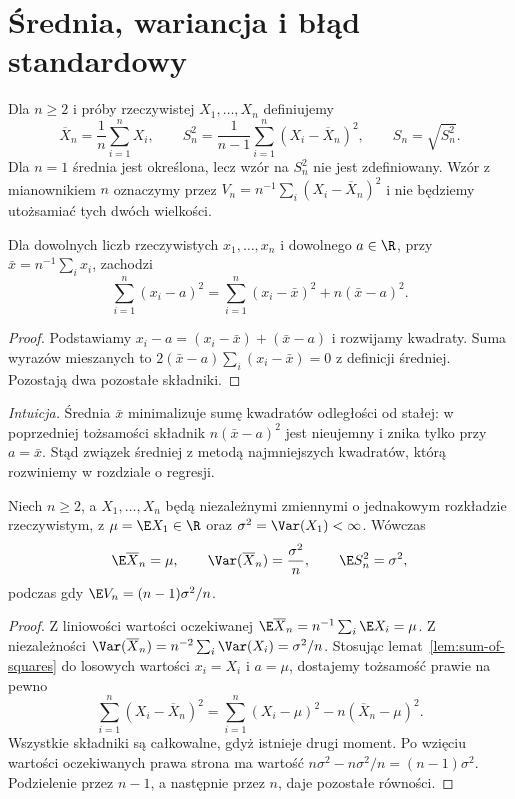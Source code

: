 \section{Średnia, wariancja i błąd standardowy}
\begin{definicja}\label{def:meanvar}
Dla $n\ge2$ i próby rzeczywistej $X_1,\ldots,X_n$ definiujemy
\[
\overline X_n=\frac1n\sum_{i=1}^nX_i,\qquad
S_n^2=\frac1{n-1}\sum_{i=1}^n(X_i-\overline X_n)^2,\qquad S_n=\sqrt{S_n^2}.
\]
Dla $n=1$ średnia jest określona, lecz wzór na $S_n^2$ nie jest zdefiniowany. Wzór z mianownikiem $n$ oznaczymy przez $V_n=n^{-1}\sum_i(X_i-\overline X_n)^2$ i nie będziemy utożsamiać tych dwóch wielkości.
\end{definicja}

\begin{lemat}\label{lem:sum-of-squares}
Dla dowolnych liczb rzeczywistych $x_1,\ldots,x_n$ i dowolnego $a\in\R$, przy $\bar x=n^{-1}\sum_i x_i$, zachodzi
\[
\sum_{i=1}^n(x_i-a)^2
=\sum_{i=1}^n(x_i-\bar x)^2+n(\bar x-a)^2.
\]
\end{lemat}
\begin{proof}
Podstawiamy $x_i-a=(x_i-\bar x)+(\bar x-a)$ i rozwijamy kwadraty. Suma wyrazów mieszanych to $2(\bar x-a)\sum_i(x_i-\bar x)=0$ z definicji średniej. Pozostają dwa pozostałe składniki.
\end{proof}

\emph{Intuicja.} Średnia $\bar x$ minimalizuje sumę kwadratów odległości od stałej: w poprzedniej tożsamości składnik $n(\bar x-a)^2$ jest nieujemny i znika tylko przy $a=\bar x$. Stąd związek średniej z metodą najmniejszych kwadratów, którą rozwiniemy w rozdziale o regresji.

\begin{twierdzenie}\label{thm:unbiased-variance}
Niech $n\ge2$, a $X_1,\ldots,X_n$ będą niezależnymi zmiennymi o jednakowym rozkładzie rzeczywistym, z $\mu=\E X_1\in\R$ oraz $\sigma^2=\Var(X_1)<\infty$. Wówczas
\[
\E\overline X_n=\mu,\qquad
\Var(\overline X_n)=\frac{\sigma^2}{n},\qquad
\E S_n^2=\sigma^2,
\]
podczas gdy $\E V_n=(n-1)\sigma^2/n$.
\end{twierdzenie}
\begin{proof}
Z liniowości wartości oczekiwanej $\E\overline X_n=n^{-1}\sum_i\E X_i=\mu$. Z niezależności $\Var(\overline X_n)=n^{-2}\sum_i\Var(X_i)=\sigma^2/n$. Stosując lemat~\ref{lem:sum-of-squares} do losowych wartości $x_i=X_i$ i $a=\mu$, dostajemy tożsamość prawie na pewno
\[
\sum_{i=1}^n(X_i-\overline X_n)^2
=\sum_{i=1}^n(X_i-\mu)^2-n(\overline X_n-\mu)^2.
\]
Wszystkie składniki są całkowalne, gdyż istnieje drugi moment. Po wzięciu wartości oczekiwanych prawa strona ma wartość $n\sigma^2-n\sigma^2/n=(n-1)\sigma^2$. Podzielenie przez $n-1$, a następnie przez $n$, daje pozostałe równości.
\end{proof}

